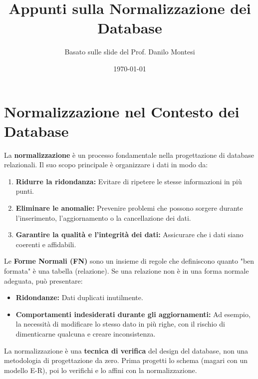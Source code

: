 

\usepackage{hyperref}

\title{Appunti sulla Normalizzazione dei Database}
\author{Basato sulle slide del Prof. Danilo Montesi}
\date{\today}


	
	\maketitle
	\tableofcontents
	\newpage
	
	\section{Normalizzazione nel Contesto dei Database}
	
	La \textbf{normalizzazione} è un processo fondamentale nella progettazione di database relazionali. Il suo scopo principale è organizzare i dati in modo da:
	\begin{enumerate}
		\item \textbf{Ridurre la ridondanza:} Evitare di ripetere le stesse informazioni in più punti.
		\item \textbf{Eliminare le anomalie:} Prevenire problemi che possono sorgere durante l'inserimento, l'aggiornamento o la cancellazione dei dati.
		\item \textbf{Garantire la qualità e l'integrità dei dati:} Assicurare che i dati siano coerenti e affidabili.
	\end{enumerate}
	
	Le \textbf{Forme Normali (FN)} sono un insieme di regole che definiscono quanto "ben formata" è una tabella (relazione). Se una relazione non è in una forma normale adeguata, può presentare:
	\begin{itemize}
		\item \textbf{Ridondanze:} Dati duplicati inutilmente.
		\item \textbf{Comportamenti indesiderati durante gli aggiornamenti:} Ad esempio, la necessità di modificare lo stesso dato in più righe, con il rischio di dimenticarne qualcuna e creare inconsistenza.
	\end{itemize}
	
	La normalizzazione è una \textbf{tecnica di verifica} del design del database, non una metodologia di progettazione da zero. Prima progetti lo schema (magari con un modello E-R), poi lo verifichi e lo affini con la normalizzazione.
	

